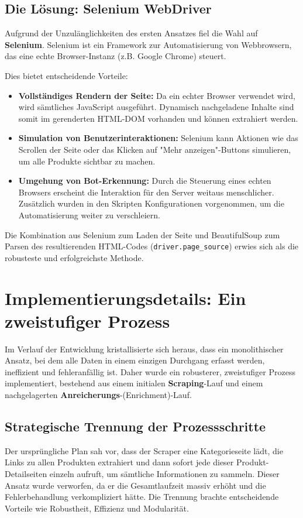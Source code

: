 \documentclass[12pt, a4paper]{report} %
\begin{document}
\subsection{Die Lösung: Selenium WebDriver}
Aufgrund der Unzulänglichkeiten des ersten Ansatzes fiel die Wahl auf \textbf{Selenium}. Selenium ist ein Framework zur Automatisierung von Webbrowsern, das eine echte Browser-Instanz (z.B. Google Chrome) steuert.

Dies bietet entscheidende Vorteile:
\begin{itemize}
    \item \textbf{Vollständiges Rendern der Seite:} Da ein echter Browser verwendet wird, wird sämtliches JavaScript ausgeführt. Dynamisch nachgeladene Inhalte sind somit im gerenderten HTML-DOM vorhanden und können extrahiert werden.
    \item \textbf{Simulation von Benutzerinteraktionen:} Selenium kann Aktionen wie das Scrollen der Seite oder das Klicken auf "Mehr anzeigen"-Buttons simulieren, um alle Produkte sichtbar zu machen.
    \item \textbf{Umgehung von Bot-Erkennung:} Durch die Steuerung eines echten Browsers erscheint die Interaktion für den Server weitaus menschlicher. Zusätzlich wurden in den Skripten Konfigurationen vorgenommen, um die Automatisierung weiter zu verschleiern.
\end{itemize}
Die Kombination aus Selenium zum Laden der Seite und BeautifulSoup zum Parsen des resultierenden HTML-Codes (\texttt{driver.page\_source}) erwies sich als die robusteste und erfolgreichste Methode.

\section{Implementierungsdetails: Ein zweistufiger Prozess}
\label{sec:scraping_prozess}
Im Verlauf der Entwicklung kristallisierte sich heraus, dass ein monolithischer Ansatz, bei dem alle Daten in einem einzigen Durchgang erfasst werden, ineffizient und fehleranfällig ist. Daher wurde ein robusterer, zweistufiger Prozess implementiert, bestehend aus einem initialen \textbf{Scraping}-Lauf und einem nachgelagerten \textbf{Anreicherungs}-(Enrichment)-Lauf.

\subsection{Strategische Trennung der Prozessschritte}
Der ursprüngliche Plan sah vor, dass der Scraper eine Kategorieseite lädt, die Links zu allen Produkten extrahiert und dann sofort jede dieser Produkt-Detailseiten einzeln aufruft, um sämtliche Informationen zu sammeln. Dieser Ansatz wurde verworfen, da er die Gesamtlaufzeit massiv erhöht und die Fehlerbehandlung verkompliziert hätte. Die Trennung brachte entscheidende Vorteile wie Robustheit, Effizienz und Modularität.
\end{document}
